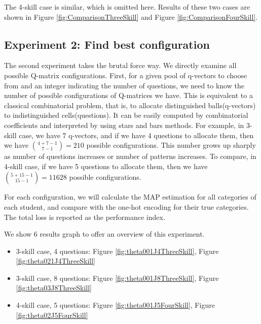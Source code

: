 \documentclass{edm_template}
\begin{document}
The 4-skill case is similar, which is omitted here. Results of these two cases are shown in Figure  \ref{fig:ComparisonThreeSkill} and Figure \ref{fig:ComparisonFourSkill}.

\subsection{Experiment 2: Find best configuration}
The second experiment takes the brutal force way. We directly examine all possible Q-matrix configurations. First, for a given pool of q-vectors to choose from and an integer indicating the number of questions, we need to know the number of possible configurations of Q-matrices we have. This is equivalent to a classical combinatorial problem, that is, to allocate distinguished balls(q-vectors) to indistinguished cells(questions). It can be easily computed by combinatorial coefficients and interpreted by using stars and bars methods. For example, in 3-skill case, we have 7 q-vectors, and if we have 4 questions to allocate them, then we have ${{4+7-1}\choose {7-1}}=210$ possible configurations. This number grows up sharply as number of questions increases or number of patterns increases. To compare, in 4-skill case, if we have 5 questions to allocate them, then we have ${{5+15-1}\choose {15-1}}=11628$ possible configurations. 

For each configuration, we will calculate the MAP estimation for all categories of each student, and compare with the one-hot encoding for their true categories. The total loss is reported as the performance index.

We show 6 results graph to offer an overview of this experiment.
\begin{itemize}
\item 3-skill case, 4 questions: Figure \ref{fig:theta001J4ThreeSkill}, Figure \ref{fig:theta021J4ThreeSkill}
\item 3-skill case, 8 questions: Figure \ref{fig:theta001J8ThreeSkill}, Figure \ref{fig:theta03J8ThreeSkill}
\item 4-skill case, 5 questions: Figure \ref{fig:theta001J5FourSkill}, Figure \ref{fig:theta02J5FourSkill}
\end{itemize}
\end{document}
